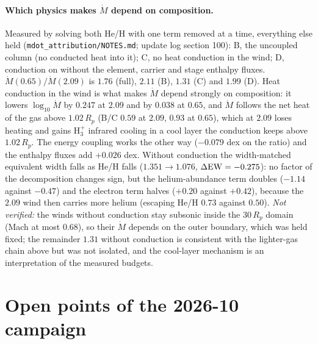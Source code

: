 \documentclass[english,a4paper]{my_memo}
\begin{document}
\paragraph{Which physics makes $\dot M$ depend on composition.} Measured by
solving both He/H with one term removed at a time, everything else held
(\texttt{mdot\_attribution/NOTES.md}; update log section 100): B, the
uncoupled column (no conducted heat into it); C, no heat conduction in the
wind; D, conduction on without the element, carrier and stage enthalpy
fluxes. $\dot M(0.65)/\dot M(2.09)$ is $1.76$ (full), $2.11$ (B), $1.31$
(C) and $1.99$ (D). Heat conduction in the wind is what makes $\dot M$
depend strongly on composition: it lowers $\log_{10}\dot M$ by $0.247$ at
$2.09$ and by $0.038$ at $0.65$, and $\dot M$ follows the net heat of the
gas above $1.02\,R_p$ (B/C $0.59$ at $2.09$, $0.93$ at $0.65$), which at
$2.09$ loses heating and gains H$_3^+$ infrared cooling in a cool layer the
conduction keeps above $1.02\,R_p$. The energy coupling works the other
way ($-0.079$ dex on the ratio) and the enthalpy fluxes add $+0.026$ dex.
Without conduction the width-matched equivalent width falls as He/H falls
($1.351 \to 1.076$, $\Delta{\rm EW} = -0.275$): no factor of the
decomposition changes sign, but the helium-abundance term doubles
($-1.14$ against $-0.47$) and the electron term halves ($+0.20$ against
$+0.42$), because the $2.09$ wind then carries more helium (escaping He/H
$0.73$ against $0.50$). \emph{Not verified:} the winds without conduction
stay subsonic inside the $30\,R_p$ domain (Mach at most $0.68$), so their
$\dot M$ depends on the outer boundary, which was held fixed; the remainder
$1.31$ without conduction is consistent with the lighter-gas chain above
but was not isolated, and the cool-layer mechanism is an interpretation of
the measured budgets.

\section{Open points of the 2026-10 campaign}
\label{sec:open2026}
\end{document}
